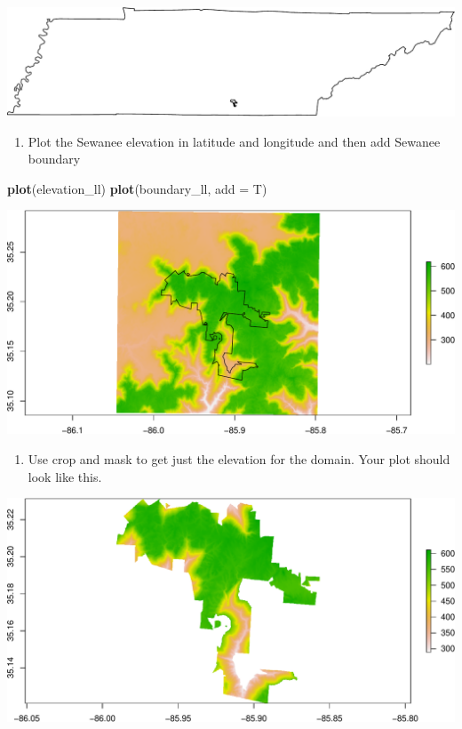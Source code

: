 \documentclass[
]{book}
\newenvironment{Shaded}{\begin{snugshade}}{\end{snugshade}}
\newcommand{\DataTypeTok}[1]{\textcolor[rgb]{0.13,0.29,0.53}{#1}}
\newcommand{\KeywordTok}[1]{\textcolor[rgb]{0.13,0.29,0.53}{\textbf{#1}}}
\newcommand{\NormalTok}[1]{#1}
\providecommand{\tightlist}{%
  \setlength{\itemsep}{0pt}\setlength{\parskip}{0pt}}
\begin{document}
\includegraphics{figures/unnamed-chunk-428-1.pdf}

\begin{enumerate}
\def\labelenumi{\arabic{enumi}.}
\setcounter{enumi}{21}
\tightlist
\item
  Plot the Sewanee elevation in latitude and longitude and then add Sewanee boundary
\end{enumerate}

\begin{Shaded}
\begin{Highlighting}[]
\KeywordTok{plot}\NormalTok{(elevation_ll)}
\KeywordTok{plot}\NormalTok{(boundary_ll, }\DataTypeTok{add =}\NormalTok{ T)}
\end{Highlighting}
\end{Shaded}

\includegraphics{figures/unnamed-chunk-429-1.pdf}

\begin{enumerate}
\def\labelenumi{\arabic{enumi}.}
\setcounter{enumi}{22}
\tightlist
\item
  Use crop and mask to get just the elevation for the domain. Your plot should look like this.
\end{enumerate}

\includegraphics{figures/unnamed-chunk-430-1.pdf}
\end{document}

